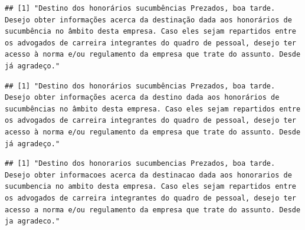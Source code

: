 \documentclass[]{article}
\newenvironment{Shaded}{\begin{snugshade}}{\end{snugshade}}
\newcommand{\DecValTok}[1]{\textcolor[rgb]{0.00,0.00,0.81}{#1}}
\newcommand{\KeywordTok}[1]{\textcolor[rgb]{0.13,0.29,0.53}{\textbf{#1}}}
\newcommand{\NormalTok}[1]{#1}
\newcommand{\OperatorTok}[1]{\textcolor[rgb]{0.81,0.36,0.00}{\textbf{#1}}}
\begin{document}
\begin{verbatim}
## [1] "Destino dos honorários sucumbências Prezados, boa tarde. Desejo obter informações acerca da destinação dada aos honorários de sucumbência no âmbito desta empresa. Caso eles sejam repartidos entre os advogados de carreira integrantes do quadro de pessoal, desejo ter acesso à norma e/ou regulamento da empresa que trate do assunto. Desde já agradeço."
\end{verbatim}

\begin{Shaded}
\end{Shaded}

\begin{verbatim}
## [1] "Destino dos honorários sucumbências Prezados, boa tarde. Desejo obter informações acerca da destino dada aos honorários de sucumbências no âmbito desta empresa. Caso eles sejam repartidos entre os advogados de carreira integrantes do quadro de pessoal, desejo ter acesso à norma e/ou regulamento da empresa que trate do assunto. Desde já agradeço."
\end{verbatim}

\begin{Shaded}
\end{Shaded}

\begin{verbatim}
## [1] "Destino dos honorarios sucumbencias Prezados, boa tarde. Desejo obter informacoes acerca da destinacao dada aos honorarios de sucumbencia no ambito desta empresa. Caso eles sejam repartidos entre os advogados de carreira integrantes do quadro de pessoal, desejo ter acesso a norma e/ou regulamento da empresa que trate do assunto. Desde ja agradeco."
\end{verbatim}

\begin{Shaded}
\end{Shaded}
\end{document}
